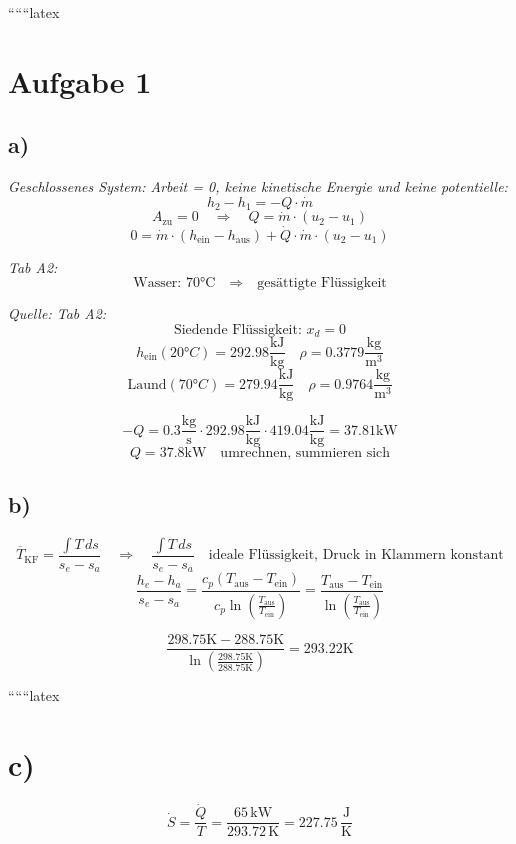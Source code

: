 
``````latex


\section*{Aufgabe 1}

\subsection*{a)}
\textit{Geschlossenes System: Arbeit = 0, keine kinetische Energie und keine potentielle:}
\[
h_2 - h_1 = -Q \cdot \dot{m}
\]
\[
A_{\text{zu}} = 0 \quad \Rightarrow \quad Q = \dot{m} \cdot (u_2 - u_1)
\]
\[
0 = \dot{m} \cdot (h_{\text{ein}} - h_{\text{aus}}) + \dot{Q} \cdot \dot{m} \cdot (u_2 - u_1)
\]

\textit{Tab A2:}
\[
\text{Wasser: 70°C} \quad \Rightarrow \quad \text{gesättigte Flüssigkeit}
\]

\textit{Quelle: Tab A2:}
\[
\text{Siedende Flüssigkeit: } x_d = 0
\]
\[
h_{\text{ein}}(20°C) = 292.98 \frac{\text{kJ}}{\text{kg}} \quad \rho = 0.3779 \frac{\text{kg}}{\text{m}^3}
\]
\[
\text{Laund}(70°C) = 279.94 \frac{\text{kJ}}{\text{kg}} \quad \rho = 0.9764 \frac{\text{kg}}{\text{m}^3}
\]

\[
-Q = 0.3 \frac{\text{kg}}{\text{s}} \cdot 292.98 \frac{\text{kJ}}{\text{kg}} \cdot 419.04 \frac{\text{kJ}}{\text{kg}} = 37.81 \text{kW}
\]
\[
Q = 37.8 \text{kW} \quad \text{umrechnen, summieren sich}
\]

\subsection*{b)}
\[
\overline{T}_{\text{KF}} = \frac{\int T \, ds}{s_e - s_a} \quad \Rightarrow \quad \frac{\int T \, ds}{s_e - s_a} \quad \text{ideale Flüssigkeit, Druck in Klammern konstant}
\]
\[
\frac{h_e - h_a}{s_e - s_a} = \frac{c_p (T_{\text{aus}} - T_{\text{ein}})}{c_p \ln \left( \frac{T_{\text{aus}}}{T_{\text{ein}}} \right)} = \frac{T_{\text{aus}} - T_{\text{ein}}}{\ln \left( \frac{T_{\text{aus}}}{T_{\text{ein}}} \right)}
\]

\[
\frac{298.75 \text{K} - 288.75 \text{K}}{\ln \left( \frac{298.75 \text{K}}{288.75 \text{K}} \right)} = 293.22 \text{K}
\]

``````latex


\section*{c)}

\[
\dot{S} = \frac{\dot{Q}}{T} = \frac{65 \, \text{kW}}{293.72 \, \text{K}} = 227.75 \, \frac{\text{J}}{\text{K}}
\]


